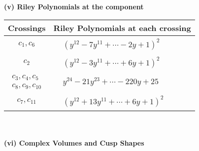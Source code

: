 \documentclass[1p]{elsarticle_modified}
\theoremstyle{definition}
\begin{document}
\newpage\renewcommand{\arraystretch}{1}
\flushleft \textbf{(v) Riley Polynomials at the component}\newline \\
\begin{tabular}{m{50pt}|m{274pt}}
Crossings & \hspace{64pt}Riley Polynomials at each crossing \\
\hline $$\begin{aligned}c_{1},c_{6}\end{aligned}$$&$\begin{aligned}
&(y^{12}-7 y^{11}+\cdots-2 y+1)^{2}
\end{aligned}$\\
\hline $$\begin{aligned}c_{2}\end{aligned}$$&$\begin{aligned}
&(y^{12}-3 y^{11}+\cdots+6 y+1)^{2}
\end{aligned}$\\
\hline $$\begin{aligned}c_{3},c_{4},c_{5}\\c_{8},c_{9},c_{10}\end{aligned}$$&$\begin{aligned}
&y^{24}-21 y^{23}+\cdots-220 y+25
\end{aligned}$\\
\hline $$\begin{aligned}c_{7},c_{11}\end{aligned}$$&$\begin{aligned}
&(y^{12}+13 y^{11}+\cdots+6 y+1)^{2}
\end{aligned}$\\
\hline
\end{tabular}\\~\\
\newpage\flushleft \textbf{(vi) Complex Volumes and Cusp Shapes}
\end{document}
